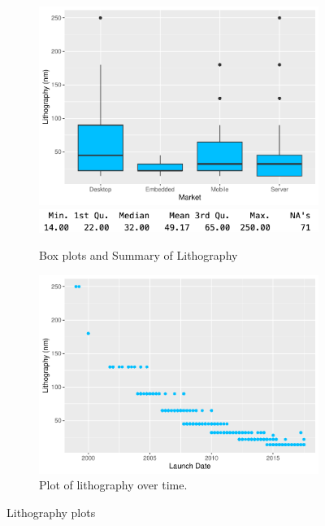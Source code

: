 \begin{figure}[H]
    \centering
    \begin{subfigure}[b]{0.49\textwidth}
        \includegraphics[width=\textwidth]{./graphics/box_litho.pdf}
        \includegraphics[width=\textwidth]{./graphics/sum_litho.png}
        \caption{Box plots and Summary of Lithography}
        \label{fig:box_litho}
    \end{subfigure}
    \hfill
    \begin{subfigure}[b]{0.49\textwidth}
        \includegraphics[width=\textwidth]{./graphics/scatter_litho.pdf}
        \caption{Plot of lithography over time.}
        \label{fig:scatter_litho}
    \end{subfigure}
    \caption{Lithography plots}
\end{figure}

